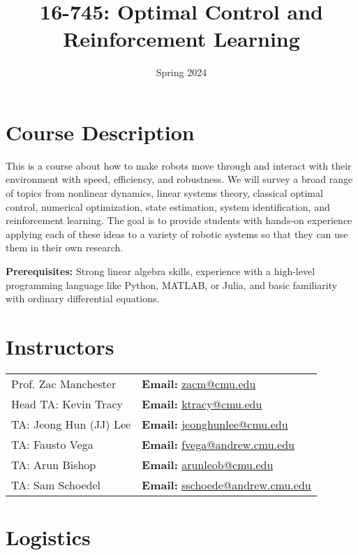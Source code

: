 \documentclass[11pt,letterpaper]{article}
\title{16-745: Optimal Control and Reinforcement Learning}
\author{Spring 2024}
\date{}
\begin{document}
\maketitle

\section*{Course Description}

This is a course about how to make robots move through and interact with their environment with speed, efficiency, and robustness. We will survey a broad range of topics from nonlinear dynamics, linear systems theory, classical optimal control, numerical optimization, state estimation, system identification, and reinforcement learning. The goal is to provide students with hands-on experience applying each of these ideas to a variety of robotic systems so that they can use them in their own research.

\medskip
\noindent
\textbf{Prerequisites:} Strong linear algebra skills, experience with a high-level programming language like Python, MATLAB, or Julia, and basic familiarity with ordinary differential equations.

\section*{Instructors}

\begin{center}
\begin{tabular}{l l}
	Prof. Zac Manchester & \textbf{Email:} \href{mailto:zacm@cmu.edu}{zacm@cmu.edu} \\
	Head TA: Kevin Tracy & \textbf{Email:} \href{mailto:ktracy@cmu.edu}{ktracy@cmu.edu}
	\\
	TA: Jeong Hun (JJ) Lee & \textbf{Email:} \href{mailto:jeonghunlee@cmu.edu}{jeonghunlee@cmu.edu}
	\\
	TA: Fausto Vega & \textbf{Email:} \href{fvega@andrew.cmu.edu}{fvega@andrew.cmu.edu}
	\\
 TA: Arun Bishop & \textbf{Email:} \href{arunleob@cmu.edu}{arunleob@cmu.edu}
 \\
	TA: Sam Schoedel & \textbf{Email:} \href{sschoede@andrew.cmu.edu}{sschoede@andrew.cmu.edu}
\end{tabular}
\end{center}

\section*{Logistics}
\end{document}
